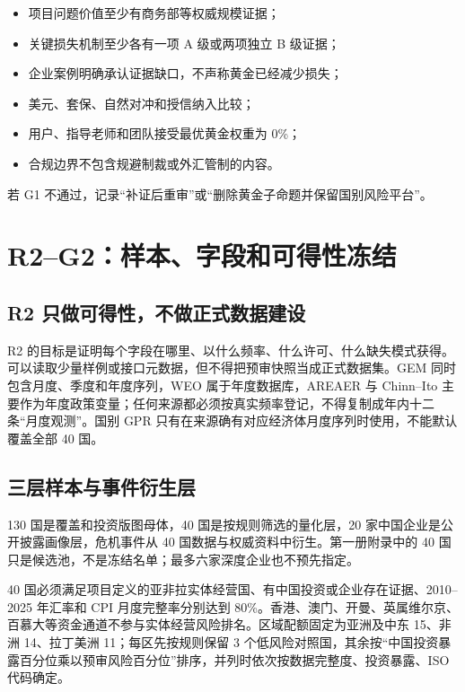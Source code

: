 \documentclass[UTF8,12pt,openany]{ctexbook}
\begin{document}
\begin{itemize}
  \item 项目问题价值至少有商务部等权威规模证据\autocite{mofcom2024ofdi}；
  \item 关键损失机制至少各有一项 A 级或两项独立 B 级证据；
  \item 企业案例明确承认证据缺口，不声称黄金已经减少损失；
  \item 美元、套保、自然对冲和授信纳入比较；
  \item 用户、指导老师和团队接受最优黄金权重为 0\%；
  \item 合规边界不包含规避制裁或外汇管制的内容。
\end{itemize}

若 G1 不通过，记录“补证后重审”或“删除黄金子命题并保留国别风险平台”。

\chapter{R2--G2：样本、字段和可得性冻结}

\section{R2 只做可得性，不做正式数据建设}
R2 的目标是证明每个字段在哪里、以什么频率、什么许可、什么缺失模式获得。可以读取少量样例或接口元数据，但不得把预审快照当成正式数据集。GEM 同时包含月度、季度和年度序列\autocite{worldbankgem}，WEO 属于年度数据库\autocite{imfweo}，AREAER 与 Chinn--Ito 主要作为年度政策变量\autocite{imfareaer,chinnito2023}；任何来源都必须按真实频率登记，不得复制成年内十二条“月度观测”。国别 GPR 只有在来源确有对应经济体月度序列时使用，不能默认覆盖全部 40 国\autocite{bdegpr2025}。

\section{三层样本与事件衍生层}
130 国是覆盖和投资版图母体，40 国是按规则筛选的量化层，20 家中国企业是公开披露画像层，危机事件从 40 国数据与权威资料中衍生。第一册附录中的 40 国只是候选池，不是冻结名单；最多六家深度企业也不预先指定。

40 国必须满足项目定义的亚非拉实体经营国、有中国投资或企业存在证据、2010--2025 年汇率和 CPI 月度完整率分别达到 80\%。香港、澳门、开曼、英属维尔京、百慕大等资金通道不参与实体经营风险排名。区域配额固定为亚洲及中东 15、非洲 14、拉丁美洲 11；每区先按规则保留 3 个低风险对照国，其余按“中国投资暴露百分位乘以预审风险百分位”排序，并列时依次按数据完整度、投资暴露、ISO 代码确定。
\end{document}
